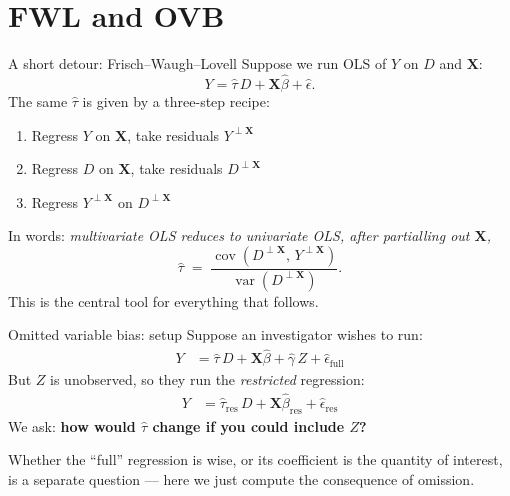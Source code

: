 \documentclass[xcolor=dvipsnames]{beamer}
\newcommand\X{{\bm X}}
\DeclareMathOperator{\var}{var}
\DeclareMathOperator{\cov}{cov}
\begin{document}
\section{FWL and OVB}

\begin{frame}{A short detour: Frisch--Waugh--Lovell}
\small
{} Suppose we run OLS of $Y$ on $D$ and $\X$:
\[
Y = \hat{\tau}\,D + \X\hat{\beta} + \hat{\epsilon}.
\]
 The same $\hat{\tau}$ is given by a three-step recipe:
\begin{enumerate}
\item Regress $Y$ on $\X$, take residuals $Y^{\perp \X}$
\item Regress $D$ on $\X$, take residuals $D^{\perp \X}$
\item Regress $Y^{\perp \X}$ on $D^{\perp \X}$
\end{enumerate}
 In words: \textit{multivariate OLS reduces to univariate OLS, after partialling out $\X$,}
\medskip
\[
\hat{\tau} \;=\; \frac{\cov(D^{\perp \X},\, Y^{\perp \X})}{\var(D^{\perp \X})}.
\]
 This is the central tool for everything that follows.
\end{frame}


\begin{frame}{Omitted variable bias: setup}
\small
{} Suppose an investigator wishes to run:\\

\begin{align*}
Y &= \hat{\tau}\, D + \X \hat{\beta} + \hat{\gamma}\, Z + \hat{\epsilon}_{\text{full}}
\end{align*}
 But $Z$ is unobserved, so they run the \textit{restricted} regression:\\
\begin{align*}
Y &= \hat{\tau}_{\text{res}}\, D + \X \hat{\beta}_{\text{res}} + \hat{\epsilon}_{\text{res}}
\end{align*}
\medskip
{} We ask: \textbf{how would $\hat{\tau}$ change if you could include $Z$?}\\

\medskip

 Whether the ``full'' regression is wise, or its coefficient is the quantity of interest, is a separate question --- here we just compute the consequence of omission.
\end{frame}
\end{document}
